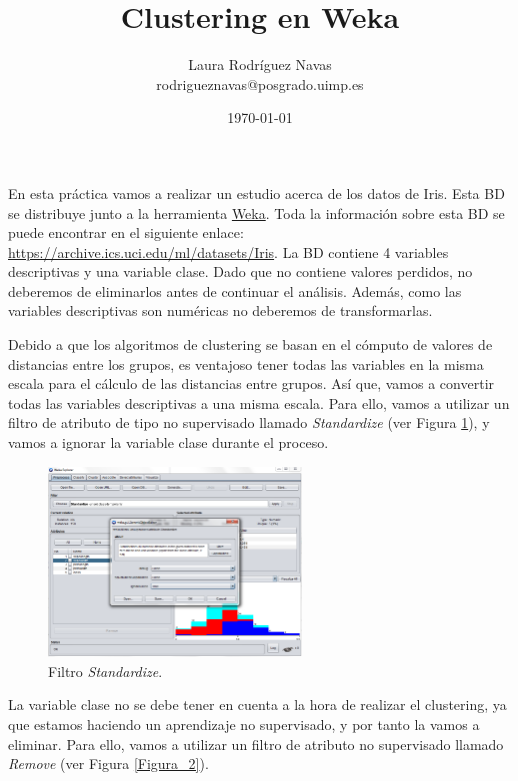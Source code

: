 \documentclass[a4paper, 11pt]{exam}
\title{Clustering en Weka}
\author{Laura Rodríguez Navas \\ rodrigueznavas@posgrado.uimp.es}
\date{\today}
\begin{document}
	
\maketitle

\renewcommand{\figurename}{Figura}
\renewcommand{\tablename}{Tabla}


En esta práctica vamos a realizar un estudio acerca de los datos de Iris. Esta BD se distribuye junto a la herramienta \href{https://www.cs.waikato.ac.nz/ml/weka/}{Weka}. Toda la información sobre esta BD se puede encontrar en el siguiente enlace: \url{https://archive.ics.uci.edu/ml/datasets/Iris}. La BD contiene 4 variables descriptivas y una variable clase. Dado que no contiene valores perdidos, no deberemos de eliminarlos antes de continuar el análisis. Además, como las variables descriptivas son numéricas no deberemos de transformarlas.

\vspace{3mm}
Debido a que los algoritmos de clustering se basan en el cómputo de valores de distancias entre los grupos, es ventajoso tener todas las variables en la misma escala para el cálculo de las distancias entre grupos. Así que, vamos a convertir todas las variables descriptivas a una misma escala. Para ello, vamos a utilizar un filtro de atributo de tipo no supervisado llamado \textit{Standardize} (ver Figura \ref{Figura_1}), y vamos a ignorar la variable clase durante el proceso.

\vspace{5mm}
\begin{figure}[h]
	\centering
	\includegraphics[width=0.6\textwidth]{iris_scaled.png}
	\caption{Filtro \textit{Standardize}.}
	\label{Figura_1}
\end{figure}

La variable clase no se debe tener en cuenta a la hora de realizar el clustering, ya que estamos haciendo un aprendizaje no supervisado, y por tanto la vamos a eliminar. Para ello, vamos a utilizar un filtro de atributo no supervisado llamado \textit{Remove} (ver Figura \ref{Figura_2}).
\end{document}
